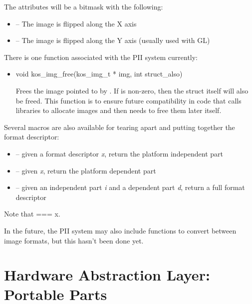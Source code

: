 \documentclass[english]{report}
\begin{document}
The attributes will be a bitmask with the following:

\begin{itemize}
\item {} -- The image is flipped along the X axis
\item {} -- The image is flipped along the Y axis (usually used with GL)
\end{itemize}

There is one function associated with the PII system currently:

\begin{itemize}
\item void kos\_img\_free(kos\_img\_t * img, int struct\_also)

Frees the image pointed to by . If  is
non-zero, then the  struct itself will also be freed. This
function is to ensure future compatibility in code that calls libraries
to allocate images and then needs to free them later itself.

\end{itemize}

Several macros are also available for tearing apart and putting together
the format descriptor:

\begin{itemize}
\item {} -- given a format descriptor \emph{x}, return
the platform independent part
\item {} -- given \emph{x}, return the platform dependent
part
\item {} -- given an independent part \emph{i} and a dependent
part \emph{d}, return a full format descriptor
\end{itemize}
Note that 
=== x.

In the future, the PII system may also include functions to convert
between image formats, but this hasn't been done yet.



\chapter{Hardware Abstraction Layer: Portable Parts}
\end{document}

